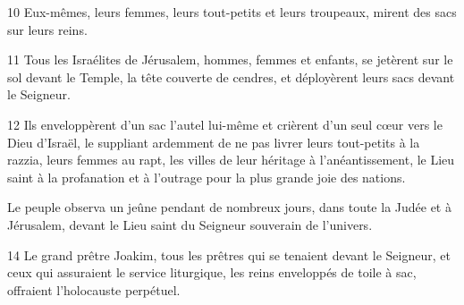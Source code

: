 

10 Eux-mêmes, leurs femmes, leurs tout-petits et leurs troupeaux, mirent des sacs sur leurs reins.

11 Tous les Israélites de Jérusalem, hommes, femmes et enfants, se jetèrent sur le sol devant le Temple, la tête couverte de cendres, et déployèrent leurs sacs devant le Seigneur.

12 Ils enveloppèrent d'un sac l'autel lui-même et crièrent d'un seul cœur vers le Dieu d'Israël, le suppliant ardemment de ne pas livrer leurs tout-petits à la razzia, leurs femmes au rapt, les villes de leur héritage à l'anéantissement, le Lieu saint à la profanation et à l'outrage pour la plus grande joie des nations.

Le peuple observa un jeûne pendant de nombreux jours, dans toute la Judée et à Jérusalem, devant le Lieu saint du Seigneur souverain de l'univers.

14 Le grand prêtre Joakim, tous les prêtres qui se tenaient devant le Seigneur, et ceux qui assuraient le service liturgique, les reins enveloppés de toile à sac, offraient l'holocauste perpétuel.